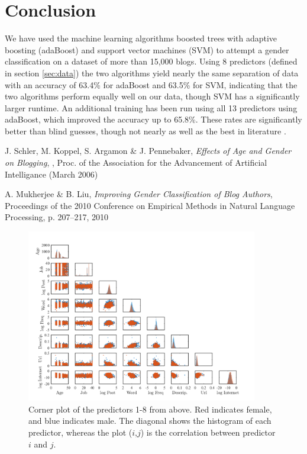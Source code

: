 \documentclass[a4paper,11pt]{article}
\begin{document}
\section{Conclusion}
We have used the machine learning algorithms boosted trees with adaptive boosting (adaBoost) and support vector machines (SVM) to attempt a gender classification on a dataset of more than 15,000 blogs. Using 8 predictors (defined in section \ref{sec:data}) the two algorithms yield nearly the same separation of data with an accuracy of 63.4\% for adaBoost and 63.5\% for SVM, indicating that the two algorithms perform equally well on our data, though SVM has a significantly larger runtime. An additional training has been run using all 13 predictors using adaBoost, which improved the accuracy up to 65.8\%. These rates are significantly better than blind guesses, though not nearly as well as the best in literature \cite{other}.


\begin{thebibliography}{9}

	J. Schler, M. Koppel, S. Argamon \& J. Pennebaker,
	\textit{Effects of Age and Gender on Blogging},
	, Proc. of the Association for the Advancement of Artificial Intelligance (March 2006)

A. Mukherjee \& B. Liu,
\textit{Improving Gender Classification of Blog Authors},
Proceedings of the 2010 Conference on Empirical Methods in Natural Language Processing, p. 207–217, 2010

\end{thebibliography}

\newpage
{}
\begin{landscape}
\begin{figure}[h]
    \centerline{\includegraphics[width=0.9\textwidth]{Pix/Corner.png}}
    \caption{Corner plot of the predictors 1-8 from above. Red indicates female, and blue indicates male. The diagonal shows the histogram of each predictor, whereas the plot ($i$,$j$) is the correlation between predictor $i$ and $j$.}
    \label{fig:Huge}
\end{figure}
\end{landscape}
\end{document}
